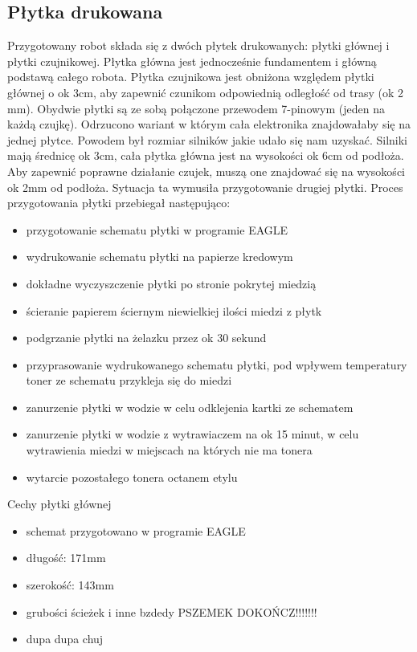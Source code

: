 \documentclass[11pt,a4paper]{article}
\begin{document}
\subsection{Płytka drukowana} Przygotowany robot składa się z dwóch płytek drukowanych: płytki głównej i płytki czujnikowej. Płytka główna jest jednocześnie fundamentem i główną podstawą całego robota. Płytka czujnikowa jest obniżona względem płytki głównej o ok 3cm, aby zapewnić czunikom odpowiednią odległość od trasy (ok 2 mm). Obydwie płytki są ze sobą połączone przewodem 7-pinowym (jeden na każdą czujkę). Odrzucono wariant w którym cała elektronika znajdowałaby się na jednej płytce. Powodem był rozmiar silników jakie udało się nam uzyskać. Silniki mają średnicę ok 3cm, cała płytka główna jest na wysokości ok 6cm od podłoża. Aby zapewnić poprawne działanie czujek, muszą one znajdować się na wysokości ok 2mm od podłoża. Sytuacja ta wymusiła przygotowanie drugiej płytki. Proces przygotowania płytki przebiegał następująco:
\begin {itemize}
    \item przygotowanie schematu płytki w programie EAGLE
    \item wydrukowanie schematu płytki na papierze kredowym
    \item dokładne wyczyszczenie płytki po stronie pokrytej miedzią
    \item ścieranie papierem ściernym niewielkiej ilości miedzi z płytk
    \item podgrzanie płytki na żelazku przez ok 30 sekund
    \item przyprasowanie wydrukowanego schematu płytki, pod wpływem temperatury toner ze schematu przykleja się do miedzi
    \item zanurzenie płytki w wodzie w celu odklejenia kartki ze schematem
    \item zanurzenie płytki w wodzie z wytrawiaczem na ok 15 minut, w celu wytrawienia miedzi w miejscach na których nie ma tonera
    \item wytarcie pozostałego tonera octanem etylu
  \end{itemize}
  Cechy płytki głównej
  \begin{itemize}
    \item schemat przygotowano w programie EAGLE
    \item długość: 171mm
    \item szerokość: 143mm
    \item grubości ścieżek i inne bzdedy PSZEMEK DOKOŃCZ!!!!!!!
    \item dupa dupa chuj
  \end{itemize}
\end{document}
